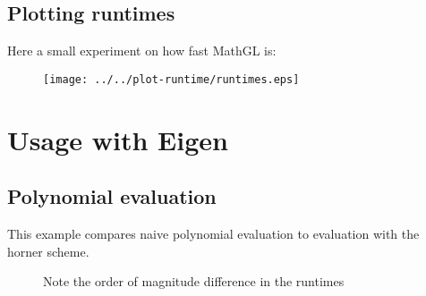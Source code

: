 \documentclass[a4paper]{article}
\begin{document}
\subsection{Plotting runtimes}

Here a small experiment on how fast MathGL is: 
\begin{figure}[h]
  \centering
  \texttt{[image: ../../plot-runtime/runtimes.eps]}
\end{figure}

\section{Usage with Eigen}

\subsection{Polynomial evaluation}

This example compares naive polynomial evaluation to evaluation with the horner scheme. 
\begin{figure}[h]
  \caption{Note the order of magnitude difference in the runtimes}
\end{figure}
\end{document}
